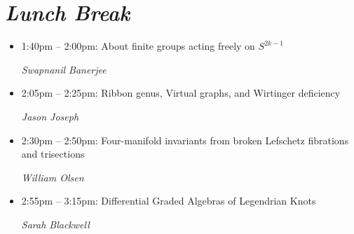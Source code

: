 \documentclass[oneside]{amsart}
\begin{document}
\section*{\textit{Lunch Break}}
\vspace{0.5em}
\begin{itemize}
\setlength\itemsep{1em}

\item 1:40pm -- 2:00pm: About finite groups acting freely on $S^{2k-1}$ \\ \vspace{-1.5em} \begin{flushright}\textit{ Swapnanil Banerjee }\end{flushright}
\item 2:05pm -- 2:25pm: Ribbon genus, Virtual graphs, and Wirtinger deficiency \\ \vspace{-1.5em} \begin{flushright}\textit{ Jason Joseph }\end{flushright}
\item 2:30pm -- 2:50pm: Four-manifold invariants from broken Lefschetz fibrations and trisections \\ \vspace{-1.5em} \begin{flushright}\textit{ William Olsen }\end{flushright}
\item 2:55pm -- 3:15pm: Differential Graded Algebras of Legendrian Knots \\ \vspace{-1.5em} \begin{flushright}\textit{ Sarah Blackwell }\end{flushright}

\end{itemize}
\end{document}
